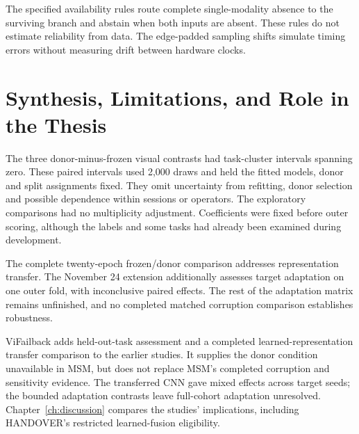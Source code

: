The specified availability rules route complete single-modality absence to the surviving
branch and abstain when both inputs are absent. These rules do not estimate reliability
from data. The edge-padded sampling shifts simulate timing errors without measuring
drift between hardware clocks.


\section{Synthesis, Limitations, and Role in the Thesis}
The three donor-minus-frozen visual contrasts had task-cluster intervals spanning zero.
These paired intervals used 2,000 draws and held the fitted models, donor and split
assignments fixed. They omit uncertainty from refitting, donor selection and possible
dependence within sessions or operators. The exploratory comparisons had no multiplicity
adjustment. Coefficients were fixed before outer scoring, although the labels and some
tasks had already been examined during development.

The complete twenty-epoch frozen/donor comparison addresses representation transfer. The
November 24 extension additionally assesses target adaptation on one outer fold, with
inconclusive paired effects. The rest of the adaptation matrix remains unfinished, and
no completed matched corruption comparison establishes robustness.

ViFailback adds held-out-task assessment and a completed learned-representation
transfer comparison to the earlier studies. It supplies the donor condition unavailable
in MSM, but does not replace MSM's completed corruption and sensitivity evidence.
The transferred CNN gave mixed effects across target seeds; the bounded adaptation
contrasts leave full-cohort adaptation unresolved. Chapter~\ref{ch:discussion} compares
the studies' implications, including HANDOVER's restricted learned-fusion eligibility.
